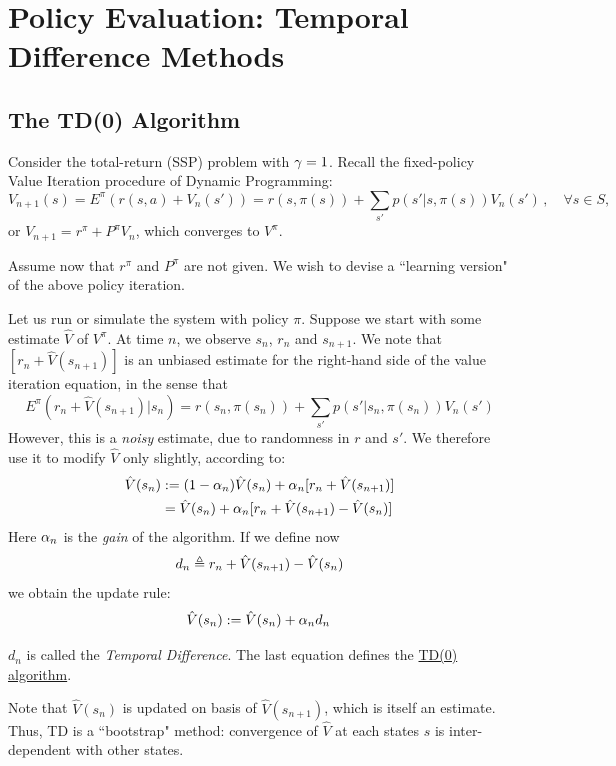 \section{Policy Evaluation: Temporal Difference Methods}

\subsection{The TD(0) Algorithm}\label{ss:TD0}

Consider the total-return (SSP) problem with $\gamma=1$.
Recall the fixed-policy Value Iteration procedure of Dynamic Programming:
$$
V_{n+1}(s) = E^{\pi} (r(s,a) + V_n(s') )
           = r(s,\pi(s)) + \sum_{s'} p(s' | s,\pi(s)) V_n(s')\,,\quad \forall s\in S,
$$
or $V_{n+1}  = r^{\pi} + P^{\pi} V_n$, which converges to $V^{\pi}$.

Assume now that $r^{\pi}$ and $P^{\pi}$ are not given.
We wish to devise a ``learning version" of the above policy iteration.

Let us run or simulate the system with policy $\pi$.
Suppose we start with some estimate $\hat V$ of $V^{\pi}$.
At time $n$, we observe $s_n$, $r_n$ and $s_{n+1}$.
We note that $[r_n + \hat V(s_{n+1})]$ is an unbiased
estimate for the right-hand side of the value iteration equation,
in the sense that
$$
E^\pi (r_n + \hat V(s_{n+1}) | s_n) =
r(s_n,\pi(s_n)) + \sum_{s'} p(s' | s_n,\pi(s_n)) V_n(s')
$$
However, this is a {\em noisy} estimate, due to randomness in $r$ and $s'$.
We therefore use it to modify $\hat V$ only slightly, according to:
\begin{align*}
\hat V (s_n) & := (1-\alpha_n) \hat V(s_n) + \alpha_n [r_n + \hat V (s_{n+1}) ] \\
& = \hat V(s_n) + \alpha_n [r_n + \hat V(s_{n+1}) - \hat V(s_n)]
\end{align*}
Here $\alpha_n$ is the {\em gain} of the algorithm.
If we define now
$$
d_n \triangleq r_n + \hat V(s_{n+1}) - \hat V(s_n)
$$
we obtain the update rule:
$$
\hat V (s_n) := \hat V(s_n)+\alpha_n d_n \,
$$

$d_n$ is called the {\em Temporal Difference}.
The last equation defines the \underline{TD(0) algorithm}.



Note that $\hat V(s_n)$ is updated on basis of $\hat V(s_{n+1})$, which is
itself an estimate.  Thus, TD is a ``bootstrap" method: convergence of
$\hat V$ at each states $s$ is inter-dependent with other states.

